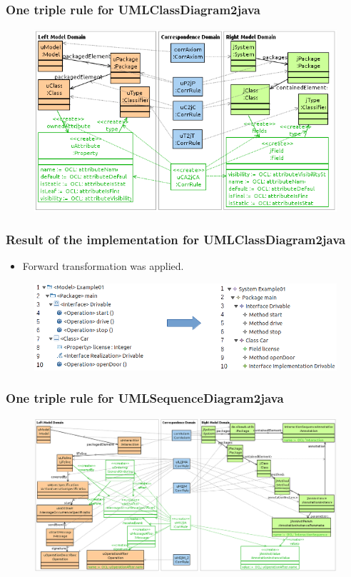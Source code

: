 \documentclass{beamer}
\begin{document}
\begin{frame}[t]
	\frametitle{One triple rule for UMLClassDiagram2java}
	\begin{figure}
		\includegraphics[width=\textwidth]{uCAttribute2jCField}
	\end{figure}
\end{frame}

\begin{frame}[t]
	\frametitle{Result of the implementation for UMLClassDiagram2java}
	\begin{itemize}
		\item Forward transformation was applied.
	\end{itemize}
	\begin{figure}
		\includegraphics[width=\textwidth]{umlClassDiagram2java_Example01}
	\end{figure}
\end{frame}

\begin{frame}[t]
	\frametitle{One triple rule for UMLSequenceDiagram2java}

	\begin{figure}
		\includegraphics[width=\textwidth]{uMessageSequence2jInteractionAnnotation}
	\end{figure}
\end{frame}
\end{document}
